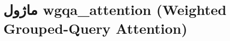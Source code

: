 \section{ماژول wgqa\_attention (Weighted Grouped-Query Attention)}
\label{sec:module_wgqa_attention}
